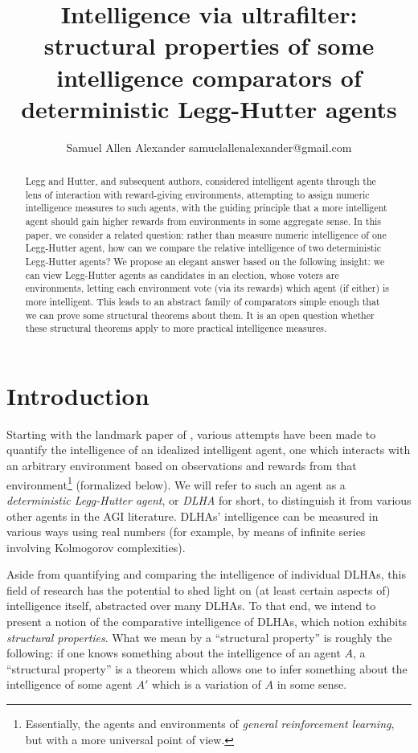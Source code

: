 \documentclass[twoside,11pt]{article}
\author{\name Samuel Allen Alexander \email samuelallenalexander@gmail.com}
\title{Intelligence via ultrafilter: structural properties of some intelligence
comparators of deterministic Legg-Hutter agents}
\begin{document}
\maketitle

\begin{abstract}
    Legg and Hutter, and subsequent authors, considered intelligent agents
    through the lens of interaction with reward-giving
    environments, attempting to
    assign numeric intelligence measures to such agents, with the guiding
    principle that a more intelligent agent should gain higher rewards
    from environments in some aggregate sense.
    In this paper, we consider a related question: rather than measure
    numeric intelligence of one Legg-Hutter agent, how can we compare the
    relative intelligence
    of two deterministic Legg-Hutter agents? We propose an elegant answer based on
    the following insight:
    we can view Legg-Hutter agents as candidates in an election, whose voters are
    environments, letting each environment vote (via its rewards) which
    agent (if either) is more intelligent. This leads to an abstract
    family of comparators simple enough that we can prove
    some structural theorems about them. It is an open question whether
    these structural theorems apply to more practical intelligence measures.
\end{abstract}

\section{Introduction}

Starting with the landmark paper of \citet{hutter2007}, various
attempts \citep{hernandez, hibbard} have been
made to quantify the intelligence of an idealized intelligent agent, one which interacts
with an arbitrary environment based on observations and
rewards from that environment\footnote{Essentially, the agents and environments
of \emph{general reinforcement learning}, but with a more universal
point of view.}
(formalized
below).
We will refer to such an agent as a \emph{deterministic Legg-Hutter agent},
or \emph{DLHA} for short, to distinguish it from various other agents
in the AGI literature.
DLHAs' intelligence can be measured in
various ways using real numbers (for example, by
means of infinite series involving Kolmogorov complexities).

Aside from quantifying and comparing the intelligence of individual DLHAs, this field
of research has the potential to shed light on (at least certain aspects of)
intelligence itself,
abstracted over many DLHAs.
To that end, we intend to present a notion of the comparative
intelligence of DLHAs, which notion exhibits
\emph{structural properties}. What we mean by
a ``structural property'' is roughly the following: if one knows something about the
intelligence of an agent $A$, a ``structural property'' is a theorem which allows one
to infer something about the intelligence of some agent $A'$ which is a variation of
$A$ in some sense.
\end{document}
